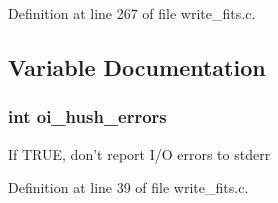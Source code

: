 Definition at line 267 of file write\_\-fits.c.



\subsection{Variable Documentation}
\hypertarget{group__oitable_gac7d4f8c8c2af780602abafd4e44d59f8}{
\subsubsection[{oi\_\-hush\_\-errors}]{\setlength{\rightskip}{0pt plus 5cm}int {\bf oi\_\-hush\_\-errors}}}
\label{group__oitable_gac7d4f8c8c2af780602abafd4e44d59f8}
If TRUE, don't report I/O errors to stderr 

Definition at line 39 of file write\_\-fits.c.

